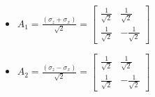 \documentclass{beamer}
\begin{document}
\begin{frame}
\begin{itemize}
\begin{minipage}{0.5\textwidth}
\begin{itemize}
                        \item ${A}_{1} = \frac{({\sigma}_{z} + {\sigma}_{x})}{\sqrt{2}} = \begin{bmatrix}
                             \frac{1}{\sqrt{2}} &  \frac{1}{\sqrt{2}} \\
                             \frac{1}{\sqrt{2}} & -\frac{1}{\sqrt{2}}
                        \end{bmatrix}$
                        \vspace{2ex}
                        \item ${A}_{2} = \frac{({\sigma}_{z} - {\sigma}_{x})}{\sqrt{2}} = \begin{bmatrix}
                             \frac{1}{\sqrt{2}} &  \frac{1}{\sqrt{2}} \\
                             \frac{1}{\sqrt{2}} & -\frac{1}{\sqrt{2}}
                        \end{bmatrix}$
                    \end{itemize}
                \end{minipage}

            \end{itemize}
		\end{frame}
\end{document}
